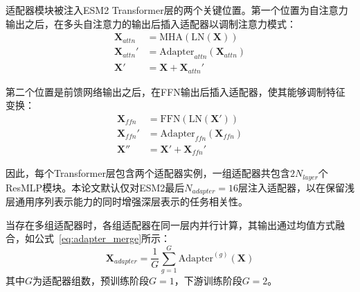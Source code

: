 适配器模块被注入ESM2 Transformer层的两个关键位置。第一个位置为自注意力输出之后，在多头自注意力的输出后插入适配器以调制注意力模式：
\begin{align}
    \mathbf{X}_{attn} &= \text{MHA}(\text{LN}(\mathbf{X})) \\
    \mathbf{X}_{attn}' &= \text{Adapter}_{attn}(\mathbf{X}_{attn}) \\
    \mathbf{X}' &= \mathbf{X} + \mathbf{X}_{attn}'
\end{align}

第二个位置是前馈网络输出之后，在FFN输出后插入适配器，使其能够调制特征变换：
\begin{align}
    \mathbf{X}_{ffn} &= \text{FFN}(\text{LN}(\mathbf{X}')) \\
    \mathbf{X}_{ffn}' &= \text{Adapter}_{ffn}(\mathbf{X}_{ffn}) \\
    \mathbf{X}'' &= \mathbf{X}' + \mathbf{X}_{ffn}'
\end{align}

因此，每个Transformer层包含两个适配器实例，一组适配器共包含$2N_{layer}$个ResMLP模块。本论文默认仅对ESM2最后$N_{adapter}=16$层注入适配器，以在保留浅层通用序列表示能力的同时增强深层表示的任务相关性。

当存在多组适配器时，各组适配器在同一层内并行计算，其输出通过均值方式融合，如公式~\eqref{eq:adapter_merge}所示：
\begin{equation}
\label{eq:adapter_merge}
    \mathbf{X}_{adapter} = \frac{1}{G}\sum_{g=1}^{G}\text{Adapter}^{(g)}(\mathbf{X})
\end{equation}
其中$G$为适配器组数，预训练阶段$G=1$，下游训练阶段$G=2$。

